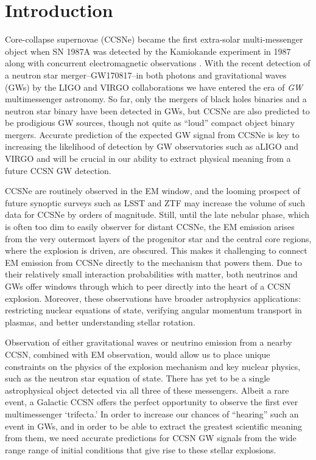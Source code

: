 \documentclass[twocolumn,times]{aastex62}  %
\begin{document}
%

\section{Introduction}

Core-collapse supernovae (CCSNe) became the first extra-solar multi-messenger object when SN 1987A was detected by the Kamiokande experiment in 1987 \citep{hirata:1987} along with concurrent electromagnetic observations \citep[cf.][]{arnett:1989}. With the recent detection of a neutron star merger--GW170817--in both photons and gravitational waves (GWs) by the LIGO and VIRGO collaborations \citep{abbott:2016} we have entered the era of {\it GW} multimessenger astronomy.  
So far, only the mergers of black holes binaries and a neutron star binary have been detected in GWs, but CCSNe are also predicted to be prodigious GW sources, though not quite as ``loud'' compact object binary mergers.
Accurate prediction of the expected GW signal from CCSNe is key to increasing the likelihood of detection by GW observatories such as aLIGO and VIRGO and will be crucial in our ability to extract physical meaning from a future CCSN GW detection.

CCSNe are routinely observed in the EM window, and the looming prospect of future synoptic surveys such as LSST and ZTF may increase the volume of such data for CCSNe by orders of magnitude.
Still, until the late nebular phase, which is often too dim to easily observer for distant CCSNe, the EM emission arises from the very outermost layers of the progenitor star and the central core regions, where the explosion is driven, are obscured. 
This makes it challenging to connect EM emission from CCSNe directly to the mechanism that powers them.
Due to their relatively small interaction probabilities with matter, both neutrinos and GWs offer windows through which to peer directly into the heart of a CCSN explosion.  
Moreover, these observations have broader astrophysics applications: restricting nuclear equations of state, verifying angular momentum transport in plasmas, and better understanding stellar rotation.

Observation of either gravitational waves or neutrino emission from a nearby CCSN, combined with EM observation, would allow us to place unique constraints on the physics of the explosion mechanism and key nuclear physics, such as the neutron star equation of state.  
There has yet to be a single astrophysical object detected via all three of these messengers.  
Albeit a rare event, a Galactic CCSN offers the perfect opportunity to observe the first ever multimessenger `trifecta.'  
In order to increase our chances of ``hearing'' such an event in GWs, and in order to be able to extract the greatest scientific meaning from them, we need accurate predictions for CCSN GW signals from the wide range range of initial conditions that give rise to these stellar explosions.
\end{document}
